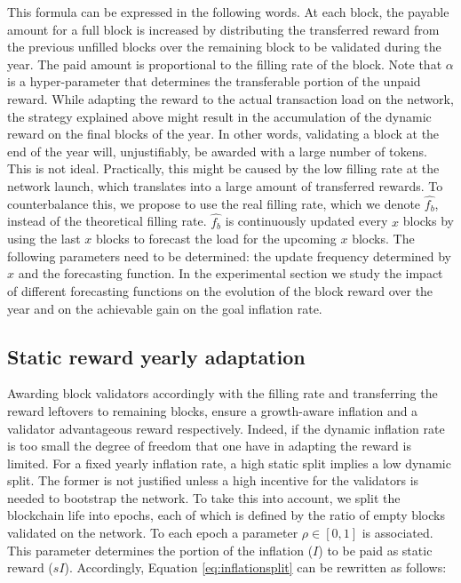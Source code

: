 \documentclass[]{article}
\begin{document}
This formula can be expressed in the following words. At each block, the payable amount for a full block is increased by distributing the transferred reward from the previous unfilled blocks over the remaining block to be validated during the year. The paid amount is proportional to the filling rate of the block. Note that $\alpha$ is a hyper-parameter that determines the transferable portion of the unpaid reward. While adapting the reward to the actual transaction load on the network, the strategy explained above might result in the accumulation of the dynamic reward on the final blocks of the year. In other words, validating a block at the end of the year will, unjustifiably, be awarded with a large number of tokens. This is not ideal. Practically, this might be caused by the low filling rate at the network launch, which translates into a large amount of transferred rewards. To counterbalance this, we propose to use the real filling rate, which we denote $\hat{f_b}$, instead of the theoretical filling rate. $\hat{f_b}$ is continuously updated every $x$ blocks by using the last $x$ blocks to forecast the load for the upcoming $x$ blocks. The following parameters need to be determined: the update frequency determined by $x$ and the forecasting function. In the experimental section we study the impact of different forecasting functions on the evolution of the block reward over the year and on the achievable gain on the goal inflation rate.

\subsection{Static reward yearly adaptation}
Awarding block validators accordingly with the filling rate and transferring the reward leftovers to remaining blocks, ensure a growth-aware inflation and a validator advantageous reward respectively. Indeed, if the dynamic inflation rate is too small the degree of freedom that one have in adapting the reward is limited. For a fixed yearly inflation rate, a high static split implies a low dynamic split. The former is not justified unless a high incentive for the validators is needed to bootstrap the network. To take this into account, we split the blockchain life into epochs, each of which is defined by the ratio of empty blocks validated on the network. To each epoch a parameter $\rho \in [0, 1]$ is associated. This parameter determines the portion of the inflation ($I$) to be paid as static reward ($sI$). Accordingly, Equation \ref{eq:inflationsplit} can be rewritten as follows:
\end{document}
